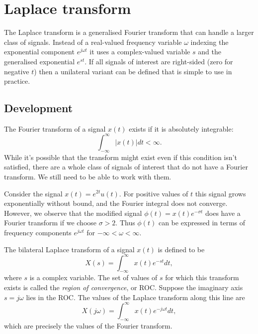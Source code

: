 \documentclass[10pt]{beamer}
\begin{document}
\pagestyle{fancy}
\fancyhead{}
\renewcommand{\headrulewidth}{0pt}
\fancyfoot[C]{\thesection-\thepage}

\begin{frame}
\titlepage
\end{frame}

\setcounter{section}{6}
\section{Laplace transform}

The Laplace transform is a generalised Fourier transform that can handle a larger class of signals.  Instead of a real-valued frequency variable $\omega$ indexing the exponential component $e^{j \omega t}$ it uses a complex-valued variable $s$ and the generalised exponential $e^{s t}$.  If all signals of interest are right-sided (zero for negative $t$) then a unilateral variant can be defined that is simple to use in practice.  

\subsection{Development}

The Fourier transform of a signal $x(t)$ exists if it is absolutely integrable:
\begin{equation*}
  \int_{-\infty}^{\infty} |x(t)| dt < \infty.
\end{equation*}
While it's possible that the transform might exist even if this condition isn't satisfied, there are a whole class of signals of interest that do not have a Fourier transform.  We still need to be able to work with them.

Consider the signal $x(t) = e^{2t} u(t)$.  For positive values of $t$ this signal grows exponentially without bound, and the Fourier integral does not converge.  However, we observe that the modified signal $\phi(t) = x(t) e^{-\sigma t}$ does have a Fourier transform if we choose $\sigma>2$.  Thus $\phi(t)$ can be expressed in terms of frequency components $e^{j \omega t}$ for $-\infty < \omega < \infty$.  

The bilateral Laplace transform of a signal $x(t)$ is defined to be
\begin{equation*}
  X(s) = \int_{-\infty}^{\infty} x(t) e^{-st} dt,
\end{equation*}
where $s$ is a complex variable.  The set of values of $s$ for which this transform exists is called the {\it region of convergence}, or ROC.   Suppose the imaginary axis $s=j \omega$ lies in the ROC.  The values of the Laplace transform along this line are
\begin{equation*}
  X(j \omega) = \int_{-\infty}^{\infty} x(t) e^{-j \omega t} dt,
\end{equation*}
which are precisely the values of the Fourier transform.
\end{document}
